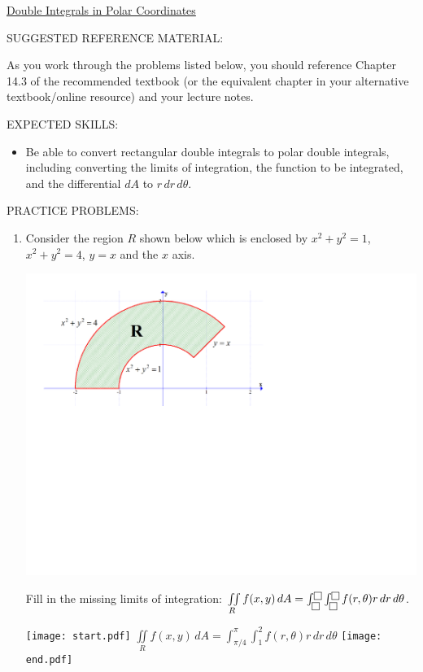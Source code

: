 \documentclass[12pt]{article}
\begin{document}
\begin{center}
\underline{\LARGE{Double Integrals in Polar Coordinates}}
\end{center}

\noindent SUGGESTED REFERENCE MATERIAL:

\bigskip

\noindent As you work through the problems listed below, you should reference Chapter 14.3 of the recommended textbook (or the equivalent chapter in your alternative textbook/online resource) and your lecture notes.

\bigskip

\noindent EXPECTED SKILLS:

\begin{itemize}

\item Be able to convert rectangular double integrals to polar double integrals, including converting the limits of integration, the function to be integrated, and the differential $dA$ to $r\,dr\,d\theta$.

\end{itemize}

\noindent PRACTICE PROBLEMS:

\medskip

\begin{enumerate}

\item Consider the region $R$ shown below which is enclosed by $x^2+y^2=1$, $x^2+y^2=4$, $y=x$ and the $x$ axis.

\begin{center}
\includegraphics[scale=0.5]{region1.pdf}
\end{center}

Fill in the missing limits of integration: $\iint \limits_{R} f(x,y) \,dA = \int_{\fbox{}}^{\fbox{}}\int_{\fbox{}}^{\fbox{}} f(r,\theta) r \,dr \,d\theta$.

\texttt{[image: start.pdf]}
{{$\iint \limits_{R} f(x,y) \,dA = \int_{\pi/4}^{\pi}\int_{1}^{2} f(r,\theta) r \,dr \,d\theta$}}
\texttt{[image: end.pdf]}


\end{enumerate}
\end{document}
